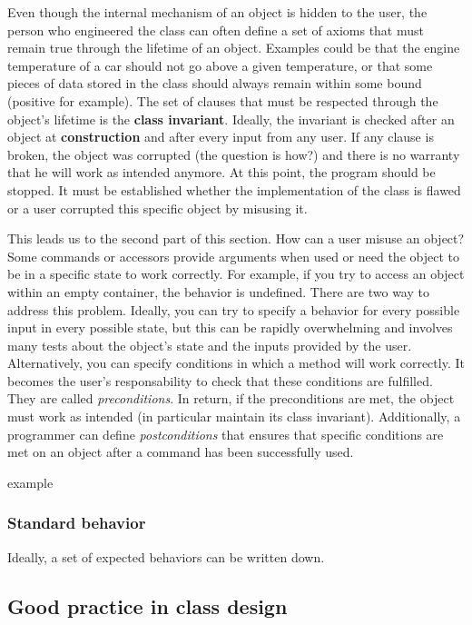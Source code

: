 \documentclass[12pt]{article}
\begin{document}
Even though the internal mechanism of an object is hidden to the user, the person who engineered the class can often define a set of axioms that must remain true through the lifetime of an object. Examples could be that the engine temperature of a car should not go above a given temperature, or that some pieces of data stored in the class should always remain within some bound (positive for example). The set of clauses that must be respected through the object's lifetime is the \textbf{class invariant}. Ideally, the invariant is checked after an object at \textbf{construction} and after every input from any user. If any clause is broken, the object was corrupted (the question is how?) and there is no warranty that he will work as intended anymore. At this point, the program should be stopped. It must be established whether the implementation of the class is flawed or a user corrupted this specific object by misusing it.

This leads us to the second part of this section. How can a user misuse an object? Some commands or accessors provide arguments when used or need the object to be in a specific state to work correctly. For example, if you try to access an object within an empty container, the behavior is undefined. There are two way to address this problem. Ideally, you can try to specify a behavior for every possible input in every possible state, but this can be rapidly overwhelming and involves many tests about the object's state and the inputs provided by the user. Alternatively, you can specify conditions in which a method will work correctly. It becomes the user's responsability to check that these conditions are fulfilled. They are called \emph{preconditions}. In return, if the preconditions are met, the object must work as intended (in particular maintain its class invariant). Additionally, a programmer can define \emph{postconditions} that ensures that specific conditions are met on an object after a command has been successfully used.

example

\subsubsection{Standard behavior}

Ideally, a set of expected behaviors can be written down.

\subsection{Good practice in class design}
\end{document}
